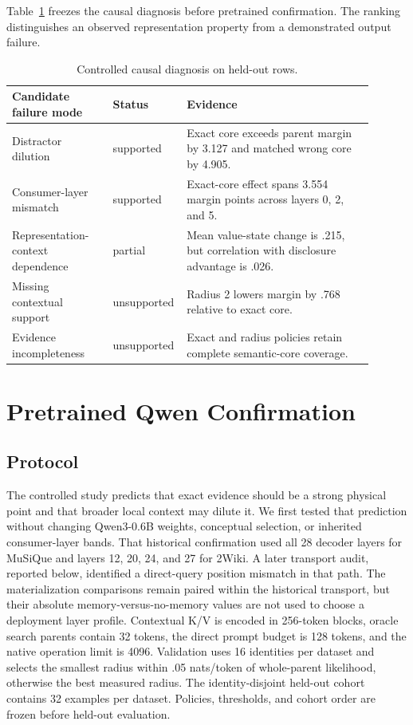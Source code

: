 \documentclass[11pt]{article}
\begin{document}
Table~\ref{tab:diagnosis} freezes the causal diagnosis before pretrained confirmation.  The ranking
distinguishes an observed representation property from a demonstrated output failure.

\begin{table}[H]
\centering
\caption{Controlled causal diagnosis on held-out rows.}
\label{tab:diagnosis}
\small
\begin{tabular}{p{0.27\linewidth}p{0.13\linewidth}p{0.50\linewidth}}
\toprule
Candidate failure mode & Status & Evidence \\
\midrule
Distractor dilution & supported & Exact core exceeds parent margin by 3.127 and matched wrong core by 4.905. \\
Consumer-layer mismatch & supported & Exact-core effect spans 3.554 margin points across layers 0, 2, and 5. \\
Representation-context dependence & partial & Mean value-state change is .215, but correlation with disclosure advantage is .026. \\
Missing contextual support & unsupported & Radius 2 lowers margin by .768 relative to exact core. \\
Evidence incompleteness & unsupported & Exact and radius policies retain complete semantic-core coverage. \\
\bottomrule
\end{tabular}
\end{table}

\section{Pretrained Qwen Confirmation}

\subsection{Protocol}

The controlled study predicts that exact evidence should be a strong physical point and that
broader local context may dilute it.  We first tested that prediction without changing
Qwen3-0.6B weights, conceptual selection, or inherited consumer-layer bands.  That historical
confirmation used all 28 decoder layers for MuSiQue and layers 12, 20, 24, and 27 for 2Wiki.  A
later transport audit, reported below, identified a direct-query position mismatch in that path.
The materialization comparisons remain paired within the historical transport, but their absolute
memory-versus-no-memory values are not used to choose a deployment layer profile.  Contextual K/V
is encoded in 256-token blocks, oracle search
parents contain 32 tokens, the direct prompt budget is 128 tokens, and the native operation limit
is 4096.  Validation uses 16 identities per dataset and selects the smallest radius within .05
nats/token of whole-parent likelihood, otherwise the best measured radius.  The identity-disjoint
held-out cohort contains 32 examples per dataset.  Policies, thresholds, and cohort order are
frozen before held-out evaluation.
\end{document}
